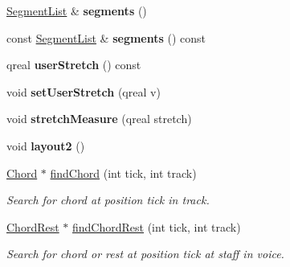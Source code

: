 \begin{DoxyCompactItemize}
\hyperlink{class_ms_1_1_segment_list}{Segment\+List} \& {\bfseries segments} ()
\item 
\mbox{\label{class_ms_1_1_measure_acbff3dcca0e52f0ce80519c3e71b6cfe}} 
const \hyperlink{class_ms_1_1_segment_list}{Segment\+List} \& {\bfseries segments} () const
\item 
\mbox{\label{class_ms_1_1_measure_afda80245c06f8b4cbb80df38d7b8eec4}} 
qreal {\bfseries user\+Stretch} () const
\item 
\mbox{\label{class_ms_1_1_measure_a922c3e99a4ff9f7a8953d720cddaf958}} 
void {\bfseries set\+User\+Stretch} (qreal v)
\item 
\mbox{\label{class_ms_1_1_measure_a979df7753ae3d039720198643f865f56}} 
void {\bfseries stretch\+Measure} (qreal stretch)
\item 
\mbox{\label{class_ms_1_1_measure_aedba86af30a033adef26958d92990e67}} 
void {\bfseries layout2} ()
\item 
\mbox{\label{class_ms_1_1_measure_ab54f551bcbc4bd989d5d04ce69036d2a}} 
\hyperlink{class_ms_1_1_chord}{Chord} $\ast$ \hyperlink{class_ms_1_1_measure_ab54f551bcbc4bd989d5d04ce69036d2a}{find\+Chord} (int tick, int track)
\begin{DoxyCompactList}\small\item\em Search for chord at position {\itshape tick} in {\itshape track}. \end{DoxyCompactList}\item 
\mbox{\label{class_ms_1_1_measure_a449d8fd1af2c8cc0a469ecb5da60027a}} 
\hyperlink{class_ms_1_1_chord_rest}{Chord\+Rest} $\ast$ \hyperlink{class_ms_1_1_measure_a449d8fd1af2c8cc0a469ecb5da60027a}{find\+Chord\+Rest} (int tick, int track)
\begin{DoxyCompactList}\small\item\em Search for chord or rest at position {\itshape tick} at {\itshape staff} in {\itshape voice}. \end{DoxyCompactList}\item 
\mbox{\label{class_ms_1_1_measure_a54cf28ea496827bb783f3f18d588aba4}} 

\end{DoxyCompactItemize}
